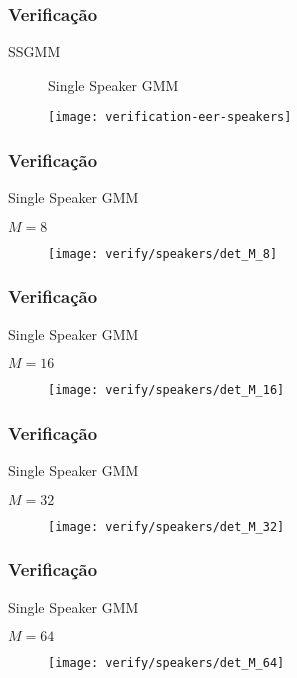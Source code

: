 \begin{frame}
\frametitle{Verificação}
\begin{description}
    \item[SSGMM] Single Speaker GMM
\end{description}

\begin{figure}[ht]
    \centering
    \texttt{[image: verification-eer-speakers]}
\end{figure}
\end{frame}

\begin{frame}
\frametitle{Verificação}
\begin{description}
    \item[SSGMM] Single Speaker GMM
    \item $M = 8$
\end{description}

\begin{figure}[ht]
    \centering
    \texttt{[image: verify/speakers/det\_M\_8]}
\end{figure}
\end{frame}

\begin{frame}
\frametitle{Verificação}
\begin{description}
    \item[SSGMM] Single Speaker GMM
    \item $M = 16$
\end{description}

\begin{figure}[ht]
    \centering
    \texttt{[image: verify/speakers/det\_M\_16]}
\end{figure}
\end{frame}

\begin{frame}
\frametitle{Verificação}
\begin{description}
    \item[SSGMM] Single Speaker GMM
    \item $M = 32$
\end{description}

\begin{figure}[ht]
    \centering
    \texttt{[image: verify/speakers/det\_M\_32]}
\end{figure}
\end{frame}

\begin{frame}
\frametitle{Verificação}
\begin{description}
    \item[SSGMM] Single Speaker GMM
    \item $M = 64$
\end{description}

\begin{figure}[ht]
    \centering
    \texttt{[image: verify/speakers/det\_M\_64]}
\end{figure}
\end{frame}


